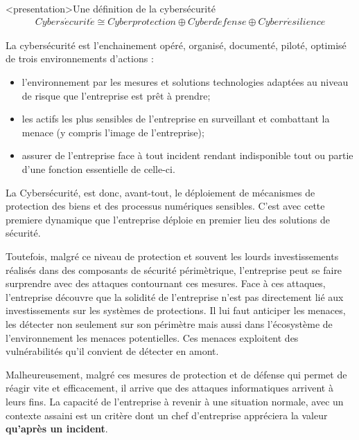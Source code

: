 \begin{frame}<presentation>{Une définition de la cybersécurité}
\begin{align}
Cybers\acute{e}curit\acute{e} \cong Cyberprotection\oplus Cyberd\acute{e}fense \oplus Cyberr\acute{e}silience
\end{align}
\end{frame}

\begin{frame}

La cybersécurité est l'enchainement opéré, organisé, documenté, piloté, optimisé de trois environnements d'actions :
\begin{itemize}
 \item {} l'environnement par les mesures et solutions technologies adaptées au niveau de risque que l'entreprise est prêt à prendre; 
 \item {} les actifs les plus sensibles de l'entreprise en surveillant et combattant la menace (y compris l'image de l'entreprise);
 \item assurer  de l'entreprise face à tout incident rendant indisponible tout ou partie d'une fonction essentielle de celle-ci.
\end{itemize}

\end{frame}

La Cybersécurité, est donc, avant-tout, le déploiement de mécanismes de protection des biens et des processus numériques sensibles. C’est avec cette premiere dynamique que l’entreprise déploie en premier lieu des solutions de sécurité. 

Toutefois, malgré ce niveau de protection et souvent les lourds investissements réalisés dans des composants de sécurité périmètrique, l’entreprise peut se faire surprendre avec des attaques contournant ces mesures. Face à ces attaques, l’entreprise découvre que la solidité de l’entreprise n’est pas directement lié aux investissements sur les systèmes de protections. Il lui faut anticiper les menaces, les détecter non seulement sur son périmètre mais aussi dans l’écosystème de l’environnement les menaces potentielles. Ces menaces exploitent des vulnérabilités qu’il convient de détecter en amont.

Malheureusement, malgré ces mesures de protection et de défense qui permet de réagir vite et efficacement, il arrive que des attaques informatiques arrivent à leurs fins. La capacité de l’entreprise à revenir à une situation normale, avec un contexte assaini est un critère dont un chef d’entreprise appréciera la valeur\textbf{ qu’après un incident}.

